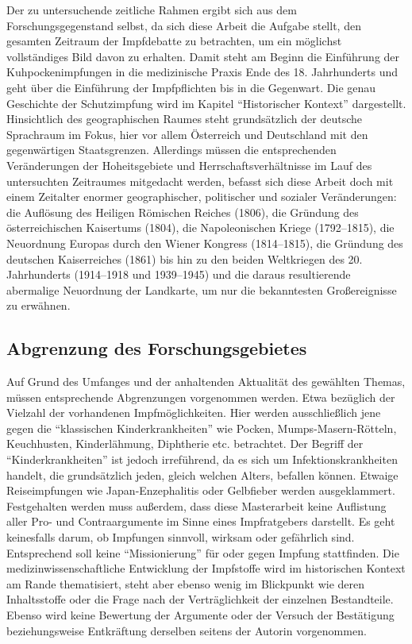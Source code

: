 \documentclass[
    a4paper,
    12pt,
    hyphens,
    chapterprefix=true,
    headheight=33pt,
    footheight=29pt,
    headings=optiontohead,
]{scrartcl}
\begin{document}
Der zu untersuchende zeitliche Rahmen ergibt sich aus dem Forschungsgegenstand selbst, da sich diese Arbeit die Aufgabe stellt, den gesamten Zeitraum der Impfdebatte zu betrachten, um ein möglichst vollständiges Bild davon zu erhalten. Damit steht am Beginn die Einführung der Kuhpockenimpfungen in die medizinische Praxis Ende des 18. Jahrhunderts und geht über die Einführung der Impfpflichten bis in die Gegenwart. Die genau Geschichte der Schutzimpfung wird im Kapitel "`Historischer Kontext"' dargestellt.\\
Hinsichtlich des geographischen Raumes steht grundsätzlich der deutsche Sprachraum im Fokus, hier vor allem Österreich und Deutschland mit den gegenwärtigen Staatsgrenzen. Allerdings müssen die entsprechenden Veränderungen der Hoheitsgebiete und Herrschaftsverhältnisse im Lauf des untersuchten Zeitraumes mitgedacht werden, befasst sich diese Arbeit doch mit einem Zeitalter enormer geographischer, politischer und sozialer Veränderungen: die Auflösung des Heiligen Römischen Reiches (1806), die Gründung des österreichischen Kaisertums (1804), die Napoleonischen Kriege (1792--1815), die Neuordnung Europas durch den Wiener Kongress (1814--1815), die Gründung des deutschen Kaiserreiches (1861) bis hin zu den beiden Weltkriegen des 20. Jahrhunderts (1914--1918 und 1939--1945) und die daraus resultierende abermalige Neuordnung der Landkarte, um nur die bekanntesten Großereignisse zu erwähnen.

\subsection{Abgrenzung des Forschungsgebietes}
Auf Grund des Umfanges und der anhaltenden Aktualität des gewählten Themas, müssen entsprechende Abgrenzungen vorgenommen werden. Etwa bezüglich der Vielzahl der vorhandenen Impfmöglichkeiten. Hier  werden ausschließlich jene gegen die "`klassischen Kinderkrankheiten"' wie Pocken, Mumps-Masern-Rötteln, Keuchhusten, Kinderlähmung, Diphtherie etc. betrachtet. Der Begriff der "`Kinderkrankheiten"' ist jedoch irreführend, da es sich um Infektionskrankheiten handelt, die grundsätzlich jeden, gleich welchen Alters, befallen können. Etwaige Reiseimpfungen wie Japan-Enzephalitis oder Gelbfieber werden ausgeklammert.\\
Festgehalten werden muss außerdem, dass diese Masterarbeit keine Auflistung aller Pro- und Contraargumente im Sinne eines Impfratgebers darstellt. Es geht keinesfalls darum, ob Impfungen sinnvoll, wirksam oder gefährlich sind. Entsprechend soll keine "`Missionierung"' für oder gegen Impfung stattfinden. Die medizinwissenschaftliche Entwicklung der Impfstoffe wird im historischen Kontext am Rande thematisiert, steht aber ebenso wenig im Blickpunkt wie deren Inhaltsstoffe oder die Frage nach der Verträglichkeit der einzelnen Bestandteile. Ebenso wird keine Bewertung der Argumente oder der Versuch der Bestätigung beziehungsweise Entkräftung derselben seitens der Autorin vorgenommen.
\end{document}
